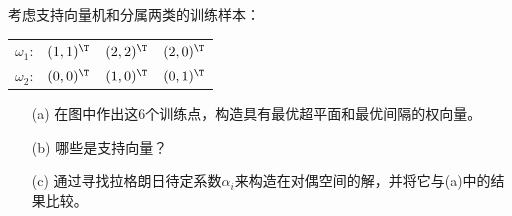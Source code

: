 \documentclass[reportComp]{thesis}
\begin{document}
\begin{question}[\textsection 5 Q32]
考虑支持向量机和分属两类的训练样本：
\begin{center}
\begin{tabular}{llll}
$\omega_1$: & $(1,1)^\T$  & $(2,2)^\T$  & $(2,0)^\T$ \\
$\omega_2$: & $(0,0)^\T$  & $(1,0)^\T$  & $(0,1)^\T$ 
\end{tabular}
\end{center}
\begin{itemize}
	\item [(a)] 在图中作出这6个训练点，构造具有最优超平面和最优间隔的权向量。
	\item [(b)] 哪些是支持向量？
	\item [(c)] 通过寻找拉格朗日待定系数$\alpha_i$来构造在对偶空间的解，并将它与(a)中的结果比较。
\end{itemize}
\end{question}
\end{document}
